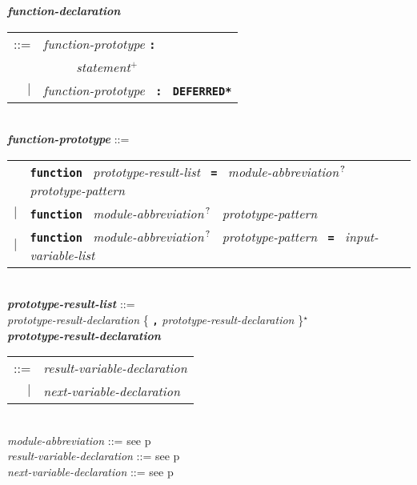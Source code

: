 \documentclass[12pt]{article}
\newcommand{\TT}[1]{{\tt \bfseries #1}}
\newcommand{\STAR}{{\Large $^\star$}}
\newcommand{\PLUS}[1][]{{$^{+#1}$}}
\newcommand{\QMARK}{{$^{\,\mbox{\footnotesize ?}}$}}
\newcommand{\ttkey}[1]{{\tt \bfseries #1}}
\newcommand{\emkey}[1]{{\em \bfseries #1}}
\newcommand{\pagref}[1]{p\pageref{#1}}
\newenvironment{indpar}[1][0.3in]%
	{\begin{list}{}%
		     {\setlength{\itemsep}{0in}%
		      \setlength{\topsep}{0in}%
		      \setlength{\parsep}{1ex}%
		      \setlength{\labelwidth}{#1}%
		      \setlength{\leftmargin}{#1}%
		      \addtolength{\leftmargin}{\labelsep}}%
	 \item}%
	{\end{list}}
\begin{document}
\begin{indpar}[0.1in]
\emkey{function-declaration}\label{FUNCTION-DECLARATION}
    \begin{tabular}[t]{rl}
    ::= &  {\em function-prototype} \TT{:} \\
	& \TT{~~~~~}{\em statement}\PLUS{} \\
    $|$ &  {\em function-prototype}~ \TT{:}~ \ttkey{*DEFERRED*} \\
    \end{tabular}
\\[2ex]
\emkey{function-prototype}\label{FUNCTION-PROTOTYPE} ::= \\
\hspace*{0.25in}
    \begin{tabular}[t]{@{}rl}
        & \ttkey{function}~
          {\em prototype-result-list}~ \TT{=}~
          {\em module-abbreviation}\QMARK{}~
	                {\em prototype-pattern} \\
    $|$ & \ttkey{function}~ {\em module-abbreviation}\QMARK{}~
                           {\em prototype-pattern} \\
    $|$ & \ttkey{function}~ {\em module-abbreviation}\QMARK{}~
                           {\em prototype-pattern}~ \TT{=}~
                           {\em input-variable-list} \\
    \end{tabular}
\\[0.5ex]
\emkey{prototype-result-list}\label{PROTOTYPE-RESULT-LIST} ::= \\
\hspace*{0.5in}
    {\em prototype-result-declaration}
    \{ \TT{,} {\em prototype-result-declaration} \}\STAR{}
\\[0.5ex]
\emkey{prototype-result-declaration}\label{PROTOTYPE-RESULT-DECLARATION} \\
\hspace*{0.5in}\begin{tabular}[t]{rl}
    ::= & {\em result-variable-declaration} \\
    $|$ & {\em next-variable-declaration} \\
    \end{tabular}
\\[0.5ex]
{\em module-abbreviation} ::= see \pagref{MODULE-ABBREVIATION}
\\[0.5ex]
{\em result-variable-declaration} ::= see \pagref{RESULT-VARIABLE-DECLARATION}
\\[0.5ex]
{\em next-variable-declaration} ::= see \pagref{NEXT-VARIABLE-DECLARATION}

\end{indpar}
\end{document}
